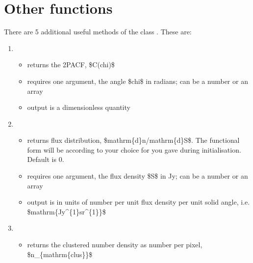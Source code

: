 \documentclass[letterpaper,10pt,english]{sphinxmanual}
\begin{document}
\chapter{Other functions}
\label{\detokenize{otherfuncs:other-functions}}\label{\detokenize{otherfuncs::doc}}
\sphinxAtStartPar
There are 5 additional useful methods of the class . These are:\sphinxhyphen{}
\begin{enumerate}
%
\item {} 
\sphinxAtStartPar
{}
\begin{itemize}
\item {} 
\sphinxAtStartPar
returns the 2PACF, \$C(chi)\$

\item {} 
\sphinxAtStartPar
requires one argument, the angle \$chi\$ in radians; can be a
number or an array

\item {} 
\sphinxAtStartPar
output is a dimensionless quantity

\end{itemize}

\item {} 
\sphinxAtStartPar
{}
\begin{itemize}
\item {} 
\sphinxAtStartPar
returns flux distribution, \$mathrm\{d\}n/mathrm\{d\}S\$. The
functional form will be according to your choice for 
you gave during initialisation. Default is 0.

\item {} 
\sphinxAtStartPar
requires one argument, the flux density \$S\$ in Jy; can be a number
or an array

\item {} 
\sphinxAtStartPar
output is in units of number per unit flux density per unit solid
angle, i.e. \$mathrm\{Jy\textasciicircum{}\{\sphinxhyphen{}1\}sr\textasciicircum{}\{\sphinxhyphen{}1\}\}\$

\end{itemize}

\item {} 
\sphinxAtStartPar
{}
\begin{itemize}
\item {} 
\sphinxAtStartPar
returns the clustered number density as number per pixel,
\$n\_\{mathrm\{clus\}\}\$


\end{itemize}
\end{enumerate}
\end{document}
